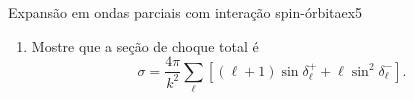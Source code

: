 \begin{exercício}{Expansão em ondas parciais com interação spin-órbita\cite{gottfried}}{ex5}
\begin{enumerate}[label=(\alph*)]
          \begin{equation*}
             g(k,\theta) = \frac1k \sum_{\ell = 0}^\infty \left(\frac{4\pi}{2\ell + 1}\right)^{\frac12} \left[(\ell + 1) a_\ell^+ + \ell a_\ell^-\right]Y_{\ell 0}(\theta)
          \end{equation*}
          e
          \begin{equation*}
             h(k,\theta) = \frac1k \sum_{\ell = 0}^\infty \left(\frac{4\pi}{2\ell + 1}\right)^{\frac12} \left[a_\ell^+ - a_\ell^-\right]i\sin\theta\diff*{Y_{\ell 0}(\theta)}{\cos\theta},
          \end{equation*}
          onde \(a_{\ell}^\pm = e^{i \delta_{\ell}^\pm} \sin\delta_{\ell}^{\pm}.\)
       \item Mostre que a seção de choque total é
          \begin{equation*}
             \sigma = \frac{4\pi}{k^2} \sum_{\ell} \left[(\ell + 1)\sin\delta^+_\ell + \ell \sin^2 \delta_\ell^-\right].
          \end{equation*}
   \end{enumerate}
\end{exercício}
